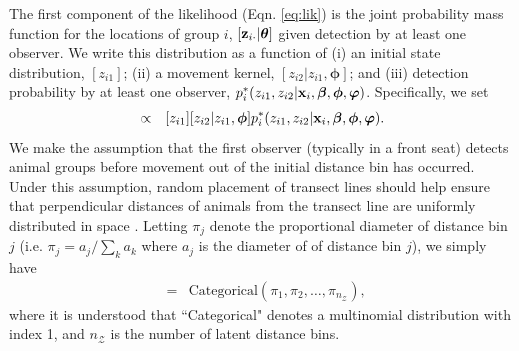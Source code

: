 \documentclass[12pt,fleqn]{article}
\begin{document}
The first component of the likelihood (Eqn. \ref{eq:lik}) is the joint probability mass function for the locations of group $i$, $[{\bf z}_{i \cdot} |\boldsymbol{\theta}]$ given detection by at least one observer.  We write this distribution as a function of (i) an initial state distribution, $[z_{i1}]$; (ii) a movement kernel, $[z_{i2}|z_{i1},\boldsymbol{\phi}]$; and (iii) detection probability by at least one observer, $p_i^*(z_{i1},z_{i2}|{\bf x}_i,\boldsymbol{\beta},\boldsymbol{\phi},\boldsymbol{\varphi})$.  Specifically, we set
\begin{eqnarray*}
[{\bf z}_{i \cdot} |\boldsymbol{\theta}] & \propto & [z_{i1}][z_{i2}|z_{i1},\boldsymbol{\phi}]p_i^*(z_{i1},z_{i2}|{\bf x}_i,\boldsymbol{\beta},\boldsymbol{\phi},\boldsymbol{\varphi}).
\end{eqnarray*}
We make the assumption that the first observer (typically in a front seat) detects animal groups before movement out of the initial distance bin has occurred.  Under this assumption, random placement of transect lines should help ensure that perpendicular distances of animals from the transect line are uniformly distributed in space \citep[cf.][]{BucklandEtAl2001}.  Letting $\pi_j$ denote the proportional diameter of distance bin $j$ (i.e. $\pi_j = a_j / \sum_k a_k$ where $a_j$ is the diameter of of distance bin $j$), we simply have
\begin{eqnarray*}
  [z_{i1}] & = & \text{Categorical}(\pi_1,\pi_2,\hdots,\pi_{n_{\mathcal{Z}}}),
\end{eqnarray*}
where it is understood that ``Categorical" denotes a multinomial distribution with index 1, and $n_{\mathcal{Z}}$ is the number of latent distance bins.
\end{document}
